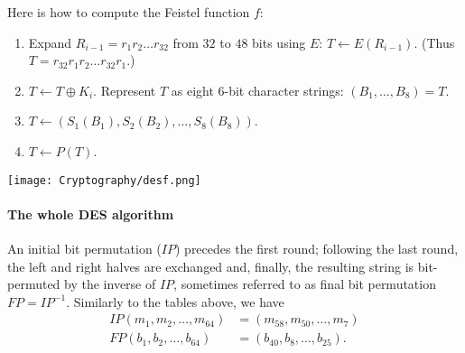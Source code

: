 \documentclass[a4paper, 11pt, openany]{book}
\begin{document}
Here is how to compute the Feistel function $f$:
\begin{enumerate}
    \item Expand $R_{i-1} = r_1 r_2 \dots r_{32}$ from $32$ to $48$ bits using $E$:
$T \gets E(R_{i-1})$. (Thus $T = r_{32} r_1 r_2 \dots r_{32} r_1$.)

    \item $T \gets T \oplus K_i$. Represent $T$ as eight $6$-bit character strings: $(B_1, \dots ,B_8) = T$.

    \item $T \gets (S_1(B_1), S_2(B_2), \dots, S_8(B_8))$.

    \item $T \gets P(T)$.
\end{enumerate}

\begin{center}
    \texttt{[image: Cryptography/desf.png]}
\end{center}





\paragraph{The whole DES algorithm}
An initial bit permutation ($IP$) precedes the first round; following the last round, the left and right halves are exchanged and, finally, the resulting string is bit-permuted by the inverse of $IP$, sometimes referred to as final bit permutation $FP = IP^{-1}$. Similarly to the tables above, we have
\begin{align*}
    IP(m_1, m_2, \dots, m_{64}) &= (m_{58}, m_{50}, \dots, m_7)\\
    FP(b_1, b_2, \dots, b_{64}) &= (b_{40}, b_8, \dots, b_{25}).
\end{align*}
\end{document}
